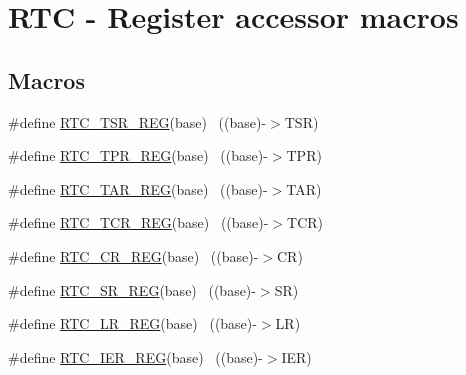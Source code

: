 \hypertarget{group___r_t_c___register___accessor___macros}{}\section{R\+TC -\/ Register accessor macros}
\label{group___r_t_c___register___accessor___macros}
\subsection*{Macros}
\begin{DoxyCompactItemize}
\item 
\#define \hyperlink{group___r_t_c___register___accessor___macros_ga09970f896ffee07c3a05b92951184ffa}{R\+T\+C\+\_\+\+T\+S\+R\+\_\+\+R\+EG}(base)                                            ~((base)-\/$>$T\+SR)
\item 
\#define \hyperlink{group___r_t_c___register___accessor___macros_ga27c10c8200591617cc2855238c16c3f1}{R\+T\+C\+\_\+\+T\+P\+R\+\_\+\+R\+EG}(base)                                            ~((base)-\/$>$T\+PR)
\item 
\#define \hyperlink{group___r_t_c___register___accessor___macros_gacf7df0fe4d98dc87b21ee82db3c7e858}{R\+T\+C\+\_\+\+T\+A\+R\+\_\+\+R\+EG}(base)                                            ~((base)-\/$>$T\+AR)
\item 
\#define \hyperlink{group___r_t_c___register___accessor___macros_ga0ffe9bb5a8168f247f3aac5de0d59080}{R\+T\+C\+\_\+\+T\+C\+R\+\_\+\+R\+EG}(base)                                            ~((base)-\/$>$T\+CR)
\item 
\#define \hyperlink{group___r_t_c___register___accessor___macros_ga478ae857b195216a8eff27d2fdb74ffd}{R\+T\+C\+\_\+\+C\+R\+\_\+\+R\+EG}(base)                                              ~((base)-\/$>$CR)
\item 
\#define \hyperlink{group___r_t_c___register___accessor___macros_ga3f1d213cb9eafd0e56eacd7f40ee8350}{R\+T\+C\+\_\+\+S\+R\+\_\+\+R\+EG}(base)                                              ~((base)-\/$>$SR)
\item 
\#define \hyperlink{group___r_t_c___register___accessor___macros_gaecf5282b232b87123b993ec1ec9bd2a5}{R\+T\+C\+\_\+\+L\+R\+\_\+\+R\+EG}(base)                                              ~((base)-\/$>$LR)
\item 
\#define \hyperlink{group___r_t_c___register___accessor___macros_ga967d371e055b3013c0f94830a357c19d}{R\+T\+C\+\_\+\+I\+E\+R\+\_\+\+R\+EG}(base)                                            ~((base)-\/$>$I\+ER)

\end{DoxyCompactItemize}
